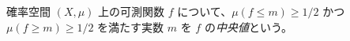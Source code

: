 確率空間 $(X, \mu)$ 上の可測関数 $f$ について、$\mu(f \le m) \ge 1/2$ かつ $\mu(f \ge m) \ge 1/2$
を満たす実数 $m$ を $f$ の\emph{中央値}という。
